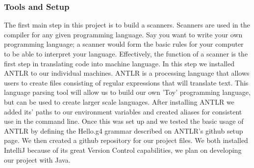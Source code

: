 \documentclass[sigconf]{acmart}
\begin{document}
\subsubsection{Tools and Setup} 
The first main step in this project is to build a scanners. Scanners are used in the compiler for any given programming language. Say you want to write your own programming language; a scanner would form the basic rules for your computer to be able to interpret your language. Effectively, the function of a scanner is the first step in translating code into machine language. In this step we installed ANTLR to our individual machines. ANTLR is a processing language that allows users to create files consisting of regular expressions that will translate text. This language parsing tool will allow us to build our own 'Toy' programming language, but can be used to create larger scale languages. After installing ANTLR we added its' paths to our environment variables and created aliases for consistent use in the command line. Once this was set up and we tested the basic usage of ANTLR by defining the Hello.g4 grammar described on ANTLR's github setup page. We then created a github repository for our project files. We both installed IntelliJ because of its great Version Control capabilities, we plan on developing our project with Java.
\newpage
\end{document}
